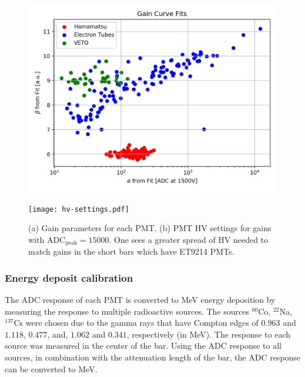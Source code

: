 \documentclass[3p,final,twocolumn]{elsarticle}
\begin{document}
\begin{figure}[th!]
	\centering
		\begin{minipage}{0.48\textwidth}
			\includegraphics[width=\textwidth]{pmt-gains.png}\\
			\subcaption{}
			\label{fig:gain}
		\end{minipage}
		\begin{minipage}{0.48\textwidth}
			\texttt{[image: hv-settings.pdf]}
			\subcaption{}
		\label{fig:hv_settings}
		\end{minipage}
		\caption{ (a) Gain parameters for each PMT. (b) PMT HV settings for gains with $\mathrm{ADC}_{\mathrm{peak}} = 15000$. One sees a greater 
		spread of HV needed to match gains in the short bars which have ET9214 PMTs.}
\end{figure}

\subsubsection{Energy deposit calibration}
The ADC response of each PMT is converted to \si{\mega\electronvolt} energy deposition by measuring the response to 
multiple radioactive sources. The sources $^{60}$Co, $^{22}$Na, $^{137}$Cs were chosen due to the gamma rays that have 
Compton edges of $0.963$ and $1.118$, $0.477$, and, $1.062$ and $0.341$, respectively (in \si{\mega\electronvolt}). The 
response to each source was measured in the center of the bar. Using the ADC response to all sources, in combination with the 
attenuation length of the bar, the ADC response can be converted to \si{\mega\electronvolt}.
\end{document}
